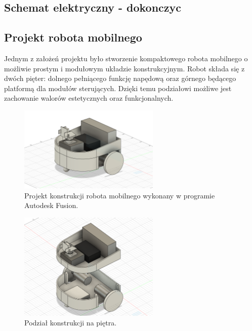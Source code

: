 \documentclass[a4paper,twoside,12pt]{book}
\begin{document}
\newpage
\subsection{Schemat elektryczny - dokonczyc}
\subsection{Projekt robota mobilnego}
Jednym z założeń projektu było stworzenie kompaktowego robota mobilnego o możliwie prostym i modułowym układzie konstrukcyjnym. Robot składa się z dwóch pięter: dolnego pełniącego funkcję napędową oraz górnego będącego platformą dla modułów sterujących. Dzięki temu podziałowi możliwe jest zachowanie walorów estetycznych oraz funkcjonalnych.
\begin{figure}[h]
    \centering
    \includegraphics[width=0.6\textwidth]{Images/Robot/Robot projekt.png}
    \caption{Projekt konstrukcji robota mobilnego wykonany w programie Autodesk Fusion.}
    \label{fig:Robot projekt}
\end{figure}
\begin{figure}[h]
    \centering
    \includegraphics[width=0.6\textwidth]{Images/Robot/Robot piętra.png}
    \caption{Podział konstrukcji na piętra.}
    \label{fig:Robot piętra}
\end{figure}
\end{document}
